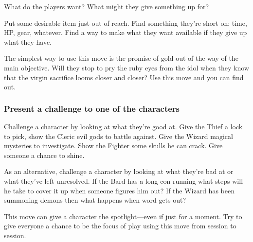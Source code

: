 What do the players want? What might they give something up for?

       

Put some desirable item just out of reach. Find something they're short on: time, HP, gear, whatever. Find a way to make what they want available if they give up what they have.

       

The simplest way to use this move is the promise of gold out of the way of the main objective. Will they stop to pry the ruby eyes from the idol when they know that the virgin sacrifice looms closer and closer? Use this move and you can find out.

       
\subsubsection{Present a challenge to one of the characters}     
       

Challenge a character by looking at what they're good at. Give the Thief a lock to pick, show the Cleric evil gods to battle against. Give the Wizard magical mysteries to investigate. Show the Fighter some skulls he can crack. Give someone a chance to shine.

       

As an alternative, challenge a character by looking at what they're bad at or what they've left unresolved. If the Bard has a long con running what steps will he take to cover it up when someone figures him out? If the Wizard has been summoning demons then what happens when word gets out?

       

This move can give a character the spotlight—even if just for a moment. Try to give everyone a chance to be the focus of play using this move from session to session.

                
